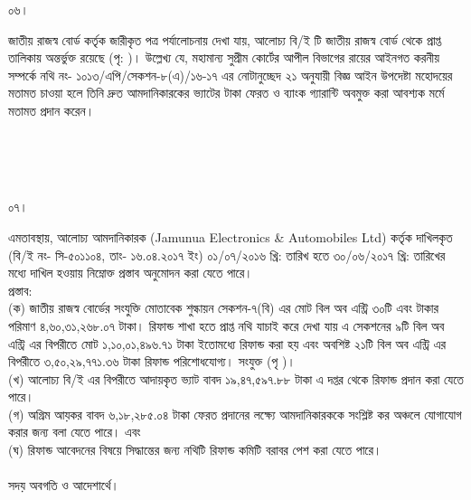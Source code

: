 \documentclass[12pt]{article}
\begin{document}
\begin{minipage}[t]{0.05\linewidth}
০৬।
\end{minipage}
\begin{minipage}[t]{1\linewidth}
জাতীয় রাজস্ব বোর্ড কর্তৃক জারীকৃত পত্র
পর্যালোচনায় দেখা যায়, আলোচ্য বি/ই টি জাতীয়
রাজস্ব বোর্ড থেকে প্রাপ্ত তালিকায় অন্তর্ভুক্ত রয়েছে
(পৃ: \hspace{3em})।
উল্লেখ্য যে, মহামান্য সুপ্রীম কোর্টের আপীল বিভাগের
রায়ের আইনগত করনীয় সম্পর্কে
নথি নং- ১০১৩/এপি/সেকশন-৮(এ)/১৬-১৭
এর নোটানুচ্ছেদ ২১ অনুযায়ী বিজ্ঞ আইন উপদেষ্টা
মহোদয়ের মতামত চাওয়া হলে তিনি দ্রুত
আমদানিকারকের ভ্যাটের টাকা ফেরত ও ব্যাংক
গ্যারান্টি অবমুক্ত করা আবশ্যক মর্মে মতামত প্রদান করেন।
\end{minipage}
\\
\\
\\
\begin{minipage}[t]{0.05\linewidth}
০৭।
\end{minipage}
\begin{minipage}[t]{1\linewidth}
এমতাবস্থায়, আলোচ্য আমদানিকারক
(Jamunua Electronics \& Automobiles Ltd)
কর্তৃক দাখিলকৃত
(বি/ই নং- সি-৫০১১০৪, তাং- ১৬.০৪.২০১৭ ইং)
০১/০৭/২০১৬ খ্রি: তারিখ হতে ৩০/০৬/২০১৭ খ্রি:
তারিখের মধ্যে দাখিল হওয়ায় নিম্নোক্ত প্রস্তাব
অনুমোদন করা যেতে পারে।
\\
প্রস্তাব:
\\
(ক) জাতীয় রাজস্ব বোর্ডের সংযুক্তি মোতাবেক শুল্কায়ন
সেকশন-৭(বি) এর মোট বিল অব এন্ট্রি ৩০টি এবং
টাকার পরিমাণ
৪,৬০,৩১,২৬৮.০৭ টাকা।
রিফান্ড শাখা হতে প্রাপ্ত নথি যাচাই করে দেখা যায় এ
সেকশনের ৯টি বিল অব এন্ট্রি এর বিপরীতে মোট
১,১০,০১,৪৯৬.৭১ টাকা
ইতোমধ্যে রিফান্ড করা হয় এবং
অবশিষ্ট ২১টি বিল অব এন্ট্রি এর বিপরীতে
৩,৫০,২৯,৭৭১.৩৬ টাকা
রিফান্ড পরিশোধযোগ্য।
সংযুক্ত (পৃ \hspace{3em})।
\\
(খ) আলোচ্য বি/ই এর বিপরীতে আদায়কৃত ভ্যাট বাবদ
১৯,৪৭,৫৯৭.৮৮ টাকা
এ দপ্তর থেকে রিফান্ড প্রদান করা যেতে পারে।
\\
(গ) অগ্রিম আয়কর বাবদ
৬,১৮,২৮৫.০৪ টাকা ফেরত প্রদানের লক্ষ্যে আমদানিকারককে
সংশ্লিষ্ট কর অঞ্চলে যোগাযোগ করার জন্য বলা যেতে পারে। এবং
\\
(ঘ) রিফান্ড আবেদনের বিষয়ে সিদ্ধান্তের জন্য নথিটি রিফান্ড
কমিটি বরাবর পেশ করা যেতে পারে।
\\
\\
সদয় অবগতি ও আদেশার্থে।

\end{minipage}




\thispagestyle{laststyle}
\end{document}
